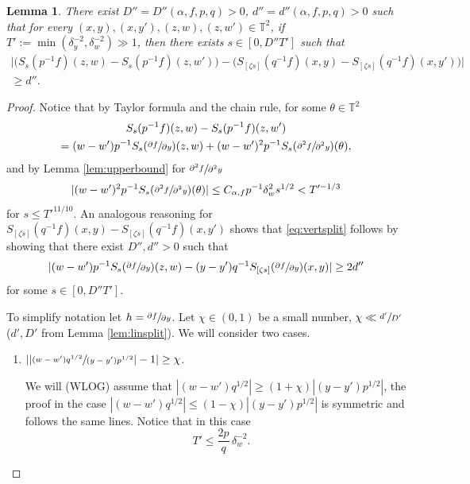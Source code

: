 \documentclass[10pt]{amsart}
\newcounter{case}
\theoremstyle{definition}
\theoremstyle{plain}
\newtheorem{lemma}[definition]{Lemma}
\newcommand\TT{\mathbb{T}}
\begin{document}
\begin{lemma}\label{lem:vertsplit}
There exist $D''=D''(\alpha,f,p,q)>0$, $d''=d''(\alpha,f,p,q)>0$ such that for every
$(x,y),(x,y'),(z,w),(z,w')\in \TT^2$, if $T':=\min(\delta_y^{-2}, \delta_w^{-2})\gg 1$, then there exists $s\in[0,D''T']$ such that
\begin{multline}\label{eq:vertsplit}
\bigl|\bigl(S_{s}(p^{-1}f)(z,w)-S_{s}(p^{-1}f)(z,w')\bigr)-
\bigl(S_{[\zeta s]}(q^{-1}f)(x,y)-S_{[\zeta s]}(q^{-1}f)(x,y')\bigr)\bigr|\\
\geq d''.
\end{multline}
\end{lemma}
\begin{proof}
Notice that by Taylor formula and the chain rule, for some $\theta\in \TT^2$\vspace*{-5pt}
\begin{multline*}
S_s(p^{-1}f)(z,w)-S_s(p^{-1}f)(z,w') \\ =
(w-w')p^{-1}S_s(\sfrac{\partial f}{\partial y})(z,w) +
(w-w')^2p^{-1}S_s(\sfrac{\partial^2 f}{\partial^2 y})(\theta),
\end{multline*}
and by Lemma \ref{lem:upperbound} for $\sfrac{\partial^2 f}{\partial^2 y}$
\[
|(w-w')^2p^{-1}S_s(\sfrac{\partial^2 f}{\partial^2 y})(\theta)|\leq C_{\alpha,f} p^{-1}\delta_w^2s^{1/2}<T'^{-1/3}
\]
for $s\leq T'^{11/10}$. An analogous reasoning for $S_{[\zeta s]}(q^{-1}f)(x,y)-S_{[\zeta s]}(q^{-1}f)(x,y')$ shows that \eqref{eq:vertsplit} follows by showing that there exist $D'',d''>0$ such that
\begin{equation}\label{eq:ghj}
|(w-w')p^{-1}S_{s}(\sfrac{\partial f}{\partial y})(z,w)-(y-y')q^{-1}S_{[\zeta s]}(\sfrac{\partial f}{\partial y})(x,y)|\geq 2d''
\end{equation}
for some $s\in [0, D''T']$.

To simplify notation let $h=\sfrac{\partial f}{\partial y}$. Let $\chi \in (0,1)$ be a small number, $\chi\ll \sfrac{d'}{D'}$ ($d',D'$ from Lemma \ref{lem:linsplit}).
We will consider two cases.

\begin{enumerate}\renewcommand{\theenumi}{\textbf{\Alph{enumi}}}
\item\label{A}
$\left||\sfrac{(w-w')q^{1/2}}{(y-y')p^{1/2}}|-1\right|\geq \chi$.

We will (WLOG) assume that $|(w-w')q^{1/2}|\geq (1+\chi)|(y-y')p^{1/2}|$, the proof in the case $|(w-w')q^{1/2}|\leq (1-\chi)|(y-y')p^{1/2}|$ is symmetric and follows the same lines. Notice that in this case
\[ \quad T'\leq \frac{2p }{q }\,\delta_w^{-2}.\]


\end{enumerate}
\end{proof}
\end{document}
